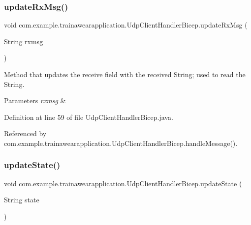 \subsubsection{\texorpdfstring{updateRxMsg()}{updateRxMsg()}}
{\footnotesize\ttfamily void com.\+example.\+trainawearapplication.\+Udp\+Client\+Handler\+Bicep.\+update\+Rx\+Msg (\begin{DoxyParamCaption}\item[{String}]{rxmsg }\end{DoxyParamCaption})\hspace{0.3cm}{\ttfamily [private]}}



Method that updates the receive field with the received String; used to read the String. 


\begin{DoxyParams}{Parameters}
{\em rxmsg} & \\
\hline
\end{DoxyParams}


Definition at line 59 of file Udp\+Client\+Handler\+Bicep.\+java.


\begin{DoxyCode}{0}

\end{DoxyCode}


Referenced by com.\+example.\+trainawearapplication.\+Udp\+Client\+Handler\+Bicep.\+handle\+Message().

\mbox{\label{classcom_1_1example_1_1trainawearapplication_1_1_udp_client_handler_bicep_aaf087b8a72f9ea8baf46baca6dc4cdc1}} 
\subsubsection{\texorpdfstring{updateState()}{updateState()}}
{\footnotesize\ttfamily void com.\+example.\+trainawearapplication.\+Udp\+Client\+Handler\+Bicep.\+update\+State (\begin{DoxyParamCaption}\item[{String}]{state }\end{DoxyParamCaption})\hspace{0.3cm}{\ttfamily [private]}}



